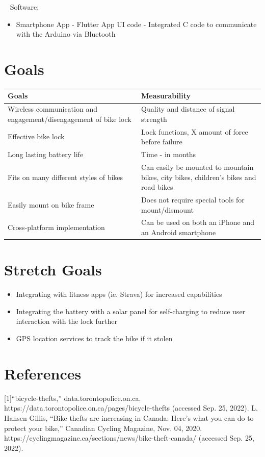 \documentclass{article}
\begin{document}
~\newline
Software: 
\begin{itemize}
\item Smartphone App
\subitem - Flutter App UI code
\subitem - Integrated C code to communicate with the Arduino via Bluetooth
\end{itemize}


\section{Goals}
\begin{table}[hp]
  \begin{center}
    \begin{tabular}{| p{0.52\linewidth} | p{0.6\linewidth} |}
    \hline
      \textbf{Goals} & \textbf{Measurability}\\
      \hline
      Wireless communication and \newline engagement/disengagement of bike lock  & Quality and distance of signal strength\\
      \hline
      Effective bike lock  & Lock functions, X amount of force before failure\\
      \hline
      Long lasting battery life  & Time - in months \\
      \hline
      Fits on many different styles of bikes & Can easily be mounted to mountain bikes, city bikes, children's bikes and road bikes \\
      \hline
      Easily mount on bike frame & Does not require special tools for mount/dismount\\
      \hline
       Cross-platform implementation & Can be used on both an iPhone and an Android smartphone\\
      \hline
    \end{tabular}
  \end{center}
\end{table}

\section{Stretch Goals}
\begin{itemize}
\item Integrating with fitness apps (ie. Strava) for increased capabilities
\item Integrating the battery with a solar panel for self-charging to reduce user interaction with the lock further
\item GPS location services to track the bike if it stolen
\end{itemize}

\newpage
\section{References}

[1]“bicycle-thefts,” data.torontopolice.on.ca. https://data.torontopolice.on.ca/pages/bicycle-thefts (accessed Sep. 25, 2022).
\newline
[2]L. Hansen-Gillis, “Bike thefts are increasing in Canada: Here’s what you can do to protect your bike,” Canadian Cycling Magazine, Nov. 04, 2020. https://cyclingmagazine.ca/sections/news/bike-theft-canada/ (accessed Sep. 25, 2022).
‌
‌
\end{document}
